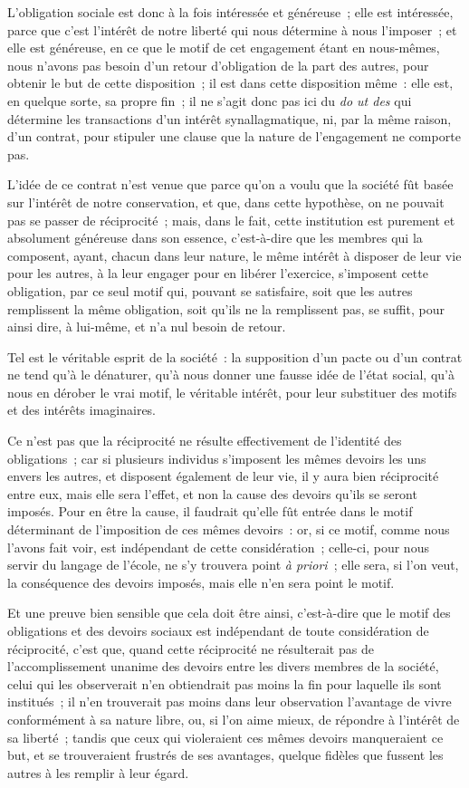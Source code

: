 \documentclass[french,twoside]{book} %
\begin{document}
L’obligation sociale est donc à la fois intéressée et généreuse ; elle est intéressée, parce que c’est l’intérêt de notre liberté qui nous détermine à nous l’imposer ; et elle est généreuse, en ce que le motif de cet engagement étant en nous-mêmes, nous n’avons pas besoin d’un retour d’obligation de la part des autres, pour obtenir le but de cette disposition ; il est dans cette disposition même : elle est, en quelque sorte, sa propre fin ; il ne s’agit donc pas ici du {\itshape do ut des} qui détermine les transactions d’un intérêt synallagmatique, ni, par la même raison, d’un contrat, pour stipuler une clause que la nature de l’engagement ne comporte pas.\par
L’idée de ce contrat n’est venue que parce qu’on a voulu que la société fût basée sur l’intérêt de notre conservation, et que, dans cette hypothèse, on ne pouvait pas se passer de réciprocité ; mais, dans le fait, cette institution est purement et absolument généreuse dans son essence, c’est-à-dire que les membres qui la composent, ayant, chacun dans leur nature, le même intérêt à disposer de leur vie pour les autres, à la leur engager pour en libérer l’exercice, s’imposent cette obligation, par ce seul motif qui, pouvant se satisfaire, soit que les autres remplissent la même obligation, soit qu’ils ne la remplissent pas, se suffit, pour ainsi dire, à lui-même, et n’a nul besoin de retour.\par
Tel est le véritable esprit de la société : la supposition d’un pacte ou d’un contrat ne tend qu’à le dénaturer, qu’à nous donner une fausse idée de l’état social, qu’à nous en dérober le vrai motif, le véritable intérêt, pour leur substituer des motifs et des intérêts imaginaires.\par
Ce n’est pas que la réciprocité ne résulte effectivement de l’identité des obligations ; car si plusieurs individus s’imposent les mêmes devoirs les uns envers les autres, et disposent également de leur vie, il y aura bien réciprocité entre eux, mais elle sera l’effet, et non la cause des devoirs qu’ils se seront imposés. Pour en être la cause, il faudrait qu’elle fût entrée dans le motif déterminant de l’imposition de ces mêmes devoirs : or, si ce motif, comme nous l’avons fait voir, est indépendant de cette considération ; celle-ci, pour nous servir du langage de l’école, ne s’y trouvera point {\itshape à priori} ; elle sera, si l’on veut, la conséquence des devoirs imposés, mais elle n’en sera point le motif.\par
Et une preuve bien sensible que cela doit être ainsi, c’est-à-dire que le motif des obligations et des devoirs sociaux est indépendant de toute considération de réciprocité, c’est que, quand cette réciprocité ne résulterait pas de l’accomplissement unanime des devoirs entre les divers membres de la société, celui qui les observerait n’en obtiendrait pas moins la fin pour laquelle ils sont institués ; il n’en trouverait pas moins dans leur observation l’avantage de vivre conformément à sa nature libre, ou, si l’on aime mieux, de répondre à l’intérêt de sa liberté ; tandis que ceux qui violeraient ces mêmes devoirs manqueraient ce but, et se trouveraient frustrés de ses avantages, quelque fidèles que fussent les autres à les remplir à leur égard.\par
\end{document}
